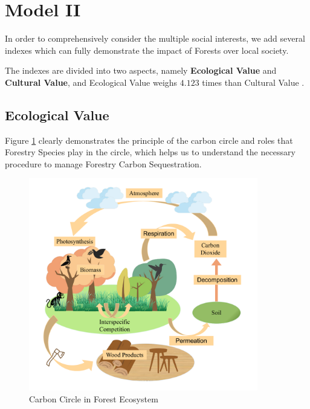 \documentclass{mcmthesis}
\numberwithin{figure}{section}
\numberwithin{table}{section}
\numberwithin{equation}{section}
\begin{document}


\newpage




\section{Model II}


In order to comprehensively consider the multiple social interests, we add
several indexes which can fully demonstrate the impact of Forests over local 
society. 
\par
The indexes are divided into two aspects, namely \textbf{Ecological Value} and \textbf{Cultural Value}, and
Ecological Value weighs $ \bm{4.123} $  times than Cultural Value \citep{2007US}. 

\subsection{Ecological Value}
Figure \ref{CarbonCircle} clearly demonstrates the principle of the carbon circle and roles that Forestry Species play in the 
circle, which helps us to understand the necessary procedure to manage Forestry Carbon Sequestration.

\begin{figure}[htbp]
  \centering
  \includegraphics[width = 10cm]{code&pic/大循环.pdf}
  \caption{Carbon Circle in Forest Ecosystem}\label{CarbonCircle}
\end{figure}
\end{document}
